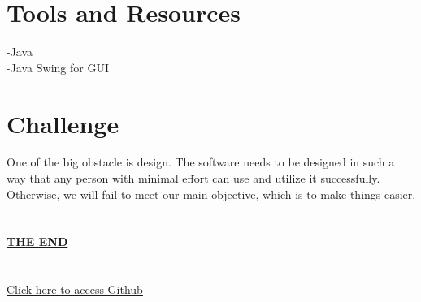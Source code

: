\documentclass{article}
\begin{document}
\section*{\LARGE Tools and Resources}
\Large -Java\\
\Large -Java Swing for GUI
 
 \pagebreak
{}
\section*{\LARGE Challenge}
\large One of the big obstacle is design. The software needs to be designed in such a way that any person with minimal effort can use and utilize it successfully. Otherwise, we will fail to meet our main objective, which is to make things easier.\\\\\\

\centering \underline{\textbf{\Large THE END}}\\

\\\LARGE\underline{\href{https://github.com/mahirshahriar1/CSE_215_Project}{\\Click here to access Github} }
\end{document}

